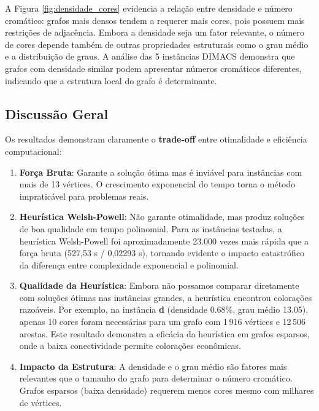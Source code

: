 \documentclass[12pt]{article}
\begin{document}
A Figura \ref{fig:densidade_cores} evidencia a relação entre densidade e número cromático: grafos mais densos tendem a requerer mais cores, pois possuem mais restrições de adjacência. Embora a densidade seja um fator relevante, o número de cores depende também de outras propriedades estruturais como o grau médio e a distribuição de graus. A análise das 5 instâncias DIMACS demonstra que grafos com densidade similar podem apresentar números cromáticos diferentes, indicando que a estrutura local do grafo é determinante.

\subsection{Discussão Geral}

Os resultados demonstram claramente o \textbf{trade-off} entre otimalidade e eficiência computacional:

\begin{enumerate}
    \item \textbf{Força Bruta}: Garante a solução ótima mas é inviável para instâncias com mais de 13 vértices. O crescimento exponencial do tempo torna o método impraticável para problemas reais.
    
    \item \textbf{Heurística Welsh-Powell}: Não garante otimalidade, mas produz soluções de boa qualidade em tempo polinomial. Para as instâncias testadas, a heurística Welsh-Powell foi aproximadamente 23.000 vezes mais rápida que a força bruta (527,53 s / 0,02293 s), tornando evidente o impacto catastrófico da diferença entre complexidade exponencial e polinomial.
    
    \item \textbf{Qualidade da Heurística}: Embora não possamos comparar diretamente com soluções ótimas nas instâncias grandes, a heurística encontrou colorações razoáveis. Por exemplo, na instância \textbf{d} (densidade 0.68\%, grau médio 13.05), apenas 10 cores foram necessárias para um grafo com 1\,916 vértices e 12\,506 arestas. Este resultado demonstra a eficácia da heurística em grafos esparsos, onde a baixa conectividade permite colorações econômicas.
    \item \textbf{Impacto da Estrutura}: A densidade e o grau médio são fatores mais relevantes que o tamanho do grafo para determinar o número cromático. Grafos esparsos (baixa densidade) requerem menos cores mesmo com milhares de vértices.
\end{enumerate}
\end{document}
